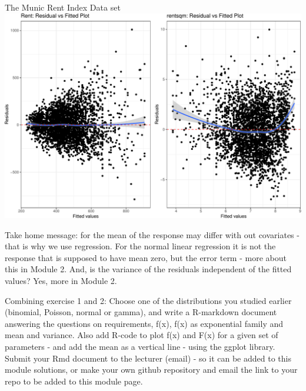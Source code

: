 \documentclass[
  ignorenonframetext,
]{beamer}
\begin{document}
\begin{frame}[fragile]
\begin{block}{The Munic Rent Index Data set}
\includegraphics{1Intro_files/figure-beamer/unnamed-chunk-12-1.pdf}

Take home message: for the mean of the response may differ with out
covariates - that is why we use regression. For the normal linear
regression it is not the response that is supposed to have mean zero,
but the error term - more about this in Module 2. And, is the variance
of the residuals independent of the fitted values? Yes, more in Module
2.
\end{block}
\end{frame}

\begin{frame}
\begin{block}{Combining exercise 1 and 2:}
\protect\hypertarget{combining-exercise-1-and-2}{}
Choose one of the distributions you studied earlier (binomial, Poisson,
normal or gamma), and write a R-markdown document answering the
questions on requirements, f(x), f(x) as exponential family and mean and
variance. Also add R-code to plot f(x) and F(x) for a given set of
parameters - and add the mean as a vertical line - using the ggplot
library. Submit your Rmd document to the lecturer (email) - so it can be
added to this module solutions, or make your own github repository and
email the link to your repo to be added to this module page.
\end{block}
\end{frame}
\end{document}
